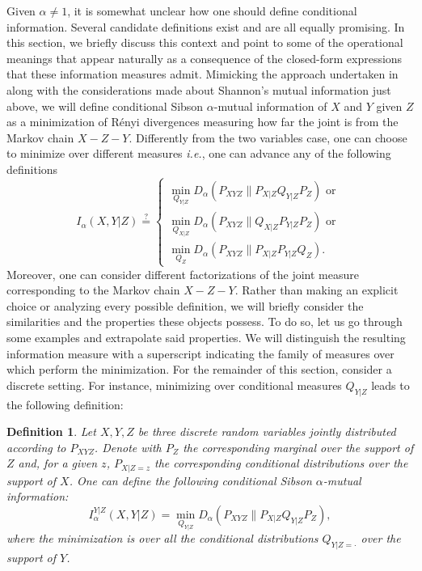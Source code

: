 \documentclass{article}
\numberwithin{theorem}{section}
\numberwithin{example}{section}
\numberwithin{remark}{section}
\newtheorem{definition}{Definition}
\numberwithin{definition}{section}
\begin{document}
Given $\alpha\neq 1$, it is somewhat unclear how one should define conditional information. Several candidate definitions exist and are all equally promising. In this section, we briefly discuss this context and point to some of the operational meanings that appear naturally as a consequence of the closed-form expressions that these information measures admit.
Mimicking the approach undertaken in~ along with the considerations made about Shannon's mutual information just above, we will define conditional Sibson $\alpha$-mutual information of $X$ and $Y$ given $Z$ as a minimization of R\'enyi divergences measuring how far the joint is from the Markov chain $X-Z-Y$. Differently from the two variables case, one can choose to minimize over different measures \textit{i.e.}, one can advance any of the following definitions
\begin{equation}
    I_\alpha(X,Y|Z) \stackrel{?}{=} \begin{cases} \min_{ Q_{Y|Z} } D_\alpha(P_{XYZ}\|P_{X|Z}Q_{Y|Z}P_Z) \text{ or } \\ \min_{ Q_{X|Z} } D_\alpha(P_{XYZ}\|Q_{X|Z}P_{Y|Z}P_Z) \text{ or }\\ \min_{ Q_{Z} } D_\alpha(P_{XYZ}\|P_{X|Z}P_{Y|Z}Q_Z).
    \end{cases}
\end{equation}
Moreover, one can consider different factorizations of the joint measure corresponding to the Markov chain $X-Z-Y$. 
Rather than making an explicit choice or analyzing every possible definition, we will briefly consider the similarities and the properties these objects possess. To do so, let us go through some examples and extrapolate said properties. We will distinguish the resulting information measure with a superscript indicating the family of measures over which perform the minimization. For the remainder of this section, consider a discrete setting. For instance, minimizing over conditional measures $Q_{Y|Z}$ leads to the following definition:
\begin{definition}
Let $X,Y,Z$ be three discrete random variables jointly distributed according to $P_{XYZ}$. Denote with $P_Z$ the corresponding marginal over the support of $Z$ and, for a given $z$, $P_{X|Z=z}$ the corresponding conditional distributions over the support of $X$. One can define the following conditional Sibson $\alpha$-mutual information: 
    \begin{equation}
    I^{Y|Z}_\alpha(X,Y|Z) = \min_{Q_{Y|Z}} D_\alpha(P_{XYZ}\|P_{X|Z}Q_{Y|Z}P_Z),\label{eq:conditionalY|Z}
\end{equation}
where the minimization is over all the conditional distributions $Q_{Y|Z=\cdot}$ over the support of $Y$.
\end{definition}
\end{document}
